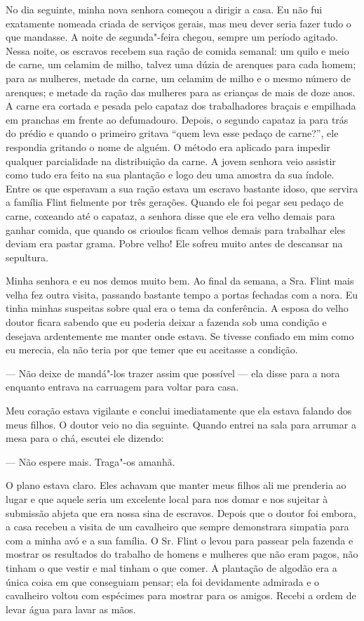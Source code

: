 No dia seguinte, minha nova senhora
começou a dirigir a casa. Eu não fui exatamente nomeada criada de
serviços gerais, mas meu dever seria fazer tudo o que mandasse. A noite
de segunda"-feira chegou, sempre um período agitado. Nessa noite, os
escravos recebem sua ração de comida semanal: um quilo e meio de carne,
um celamim de milho, talvez uma dúzia de arenques para cada homem; para
as mulheres, metade da carne, um celamim de milho e o mesmo número de
arenques; e metade da ração das mulheres para as crianças de mais de
doze anos. A carne era cortada e pesada pelo capataz dos trabalhadores
braçais e empilhada em pranchas em frente ao defumadouro. Depois, o
segundo capataz ia para trás do prédio e quando o primeiro gritava
``quem leva esse pedaço de carne?'', ele respondia gritando o nome de
alguém. O método era aplicado para impedir qualquer parcialidade na
distribuição da carne. A jovem senhora veio assistir como tudo era feito
na sua plantação e logo deu uma amostra da sua índole. Entre os que
esperavam a sua ração estava um escravo bastante idoso, que servira a
família Flint fielmente por três gerações. Quando ele foi pegar seu
pedaço de carne, coxeando até o capataz, a senhora disse que ele era
velho demais para ganhar comida, que quando os crioulos ficam velhos
demais para trabalhar eles deviam era pastar grama. Pobre velho! Ele
sofreu muito antes de descansar na sepultura.

Minha senhora e eu nos demos muito bem.
Ao final da semana, a Sra. Flint mais velha fez outra visita, passando
bastante tempo a portas fechadas com a nora. Eu tinha minhas suspeitas
sobre qual era o tema da conferência. A esposa do velho doutor ficara
sabendo que eu poderia deixar a fazenda sob uma condição e desejava
ardentemente me manter onde estava. Se tivesse confiado em mim como eu
merecia, ela não teria por que temer que eu aceitasse a condição.

--- Não deixe de mandá"-los trazer assim que possível --- ela disse para
a nora enquanto entrava na carruagem para voltar para casa.

Meu coração estava vigilante e conclui imediatamente que ela estava
falando dos meus filhos. O doutor veio no dia seguinte. Quando entrei na
sala para arrumar a mesa para o chá, escutei ele dizendo:

--- Não espere mais. Traga"-os amanhã.

O plano estava claro. Eles achavam que manter meus filhos ali me
prenderia ao lugar e que aquele seria um excelente local para nos domar
e nos sujeitar à submissão abjeta que era nossa sina de escravos. Depois
que o doutor foi embora, a casa recebeu a visita de um cavalheiro que
sempre demonstrara simpatia para com a minha avó e a sua família. O Sr.
Flint o levou para passear pela fazenda e mostrar os resultados do
trabalho de homens e mulheres que não eram pagos, não tinham o que
vestir e mal tinham o que comer. A plantação de algodão era a única
coisa em que conseguiam pensar; ela foi devidamente admirada e o
cavalheiro voltou com espécimes para mostrar para os amigos. Recebi a
ordem de levar água para lavar as mãos.

